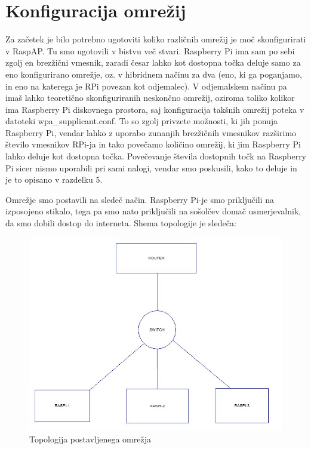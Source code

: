 \documentclass[11pt,a4paper,slovene]{article}
\begin{document}
\section{Konfiguracija omrežij}
Za začetek je bilo potrebno ugotoviti koliko različnih omrežij je moč skonfigurirati v RaspAP. Tu smo ugotovili v bistvu več stvari. Raspberry Pi ima sam po sebi zgolj en brezžični vmesnik, zaradi česar lahko kot dostopna točka deluje samo za eno konfigurirano omrežje, oz. v hibridnem načinu za dva (eno, ki ga poganjamo, in eno na katerega je RPi povezan kot odjemalec). V odjemalskem načinu pa imaš lahko teoretično skonfiguriranih neskončno omrežij, oziroma toliko kolikor ima Raspberry Pi diskovnega prostora, saj konfiguracija takšnih omrežij poteka v datoteki wpa\_supplicant.conf. To so zgolj privzete možnosti, ki jih ponuja Raspberry Pi, vendar lahko z uporabo zunanjih brezžičnih vmesnikov razširimo število vmesnikov RPi-ja in tako povečamo količino omrežij, ki jim Raspberry Pi lahko deluje kot dostopna točka. Povečevanje števila dostopnih točk na Raspberry Pi sicer nismo uporabili pri sami nalogi, vendar smo poskusili, kako to deluje in je to opisano v razdelku 5.

Omrežje smo postavili na sledeč način. Raspberry Pi-je smo priključili na izposojeno stikalo, tega pa smo nato priključili na sošolčev domač usmerjevalnik, da smo dobili dostop do interneta. Shema topologije je sledeča:
\begin{figure}[H]
	\includegraphics[width=\linewidth]{./topologija.jpg}
	\centering
	\caption{Topologija postavljenega omrežja}
\end{figure}
\end{document}
